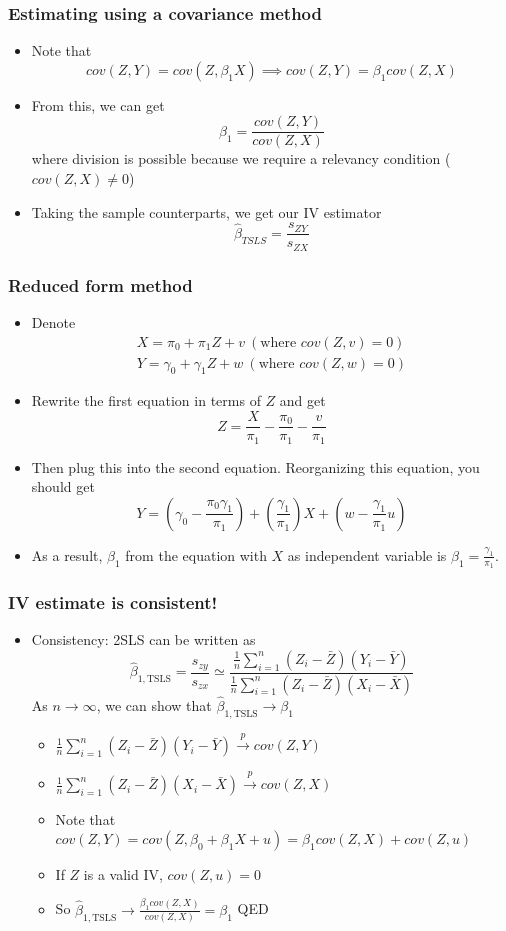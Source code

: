 \documentclass[aspectratio=169]{beamer}
\begin{document}
\begin{frame}
\frametitle{Estimating using a covariance method}
\begin{itemize}
\item Note that
\[
cov(Z,Y)=cov(Z,\beta_1X) \implies cov(Z,Y)=\beta_1cov(Z,X)
\]
\item From this, we can get
\[
\beta_1=\frac{cov(Z,Y)}{cov(Z,X)}
\]
where division is possible because we require a relevancy condition ($cov(Z,X)\neq0$)
\item Taking the sample counterparts, we get our IV estimator
\[
\hat{\beta}_{TSLS}=\frac{s_{ZY}}{s_{ZX}}
\]
\end{itemize}
\end{frame}

\begin{frame}
\frametitle{Reduced form method}
\begin{itemize}
\item Denote 
\begin{gather*}
X=\pi_0+\pi_1Z+v \ (\text{where }cov(Z,v)=0)\\ Y=\gamma_0+\gamma_1Z+w \ (\text{where }cov(Z,w)=0)
\end{gather*}
\item Rewrite the first equation in terms of $Z$ and get
\[
Z=\frac{X}{\pi_1}-\frac{\pi_0}{\pi_1}-\frac{v}{\pi_1}
\]
\item Then plug this into the second equation. Reorganizing this equation, you should get
\[
Y=\left(\gamma_0-\frac{\pi_0\gamma_1}{\pi_1}\right)+\left(\frac{\gamma_1}{\pi_1}\right)X+\left(w-\frac{\gamma_1}{\pi_1}u\right)
\]
\item As a result, $\beta_1$ from the equation with $X$ as independent variable is $\beta_1 = \frac{\gamma_1}{\pi_1}$. 
\end{itemize}
\end{frame}


\begin{frame}
\frametitle{IV estimate is consistent!}
\begin{itemize}
\item Consistency: 2SLS can be written as
\[
\hat{\beta}_{1,\text{TSLS}}=\frac{s_{zy}}{s_{zx}}\simeq\frac{\frac{1}{n}\sum_{i=1}^n(Z_i-\bar{Z})(Y_i-\bar{Y})}{\frac{1}{n}\sum_{i=1}^n(Z_i-\bar{Z})(X_i-\bar{X})}
\]
As $n\to\infty$, we can show that $\hat{\beta}_{1,\text{TSLS}}\to\beta_1$
\begin{itemize}
\item $\frac{1}{n}\sum_{i=1}^n(Z_i-\bar{Z})(Y_i-\bar{Y}) \xrightarrow{p} cov(Z,Y)$
\item $\frac{1}{n}\sum_{i=1}^n(Z_i-\bar{Z})(X_i-\bar{X}) \xrightarrow{p} cov(Z,X)$
\item Note that $cov(Z,Y) = cov(Z,\beta_0+\beta_1X+u)=\beta_1 cov(Z,X) + cov(Z,u)$
\item If $Z$ is a valid IV, $ cov(Z,u)=0$
\item So $\hat{\beta}_{1,\text{TSLS}}\to\frac{\beta_1 cov(Z,X)}{cov(Z,X)} =\beta_1$ QED
\end{itemize}
\end{itemize}
\end{frame}
\end{document}
